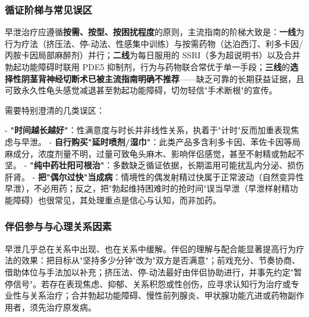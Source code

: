\subsubsection{循证阶梯与常见误区}

早泄治疗应遵循\textbf{按需、按型、按困扰程度}的原则，主流指南的阶梯大致是：\textbf{一线}为行为疗法（挤压法、停-动法、性感集中训练）与按需药物（达泊西汀、利多卡因/丙胺卡因局部麻醉剂）并行；\textbf{二线}为每日服用的 SSRI（多为超说明书）以及合并勃起功能障碍时联用 PDE5 抑制剂，行为与药物联合常优于单一手段；\textbf{三线}的\textbf{选择性阴茎背神经切断术已被主流指南明确不推荐}——缺乏可靠的长期获益证据，且可致永久性龟头感觉减退甚至勃起功能障碍，切勿轻信"手术断根"的宣传。

需要特别澄清的几类误区：

- \textbf{"时间越长越好"}：性满意度与时长并非线性关系，执着于"计时"反而加重表现焦虑与早泄。
- \textbf{自行购买"延时喷剂/湿巾"}：此类产品多含利多卡因、苯佐卡因等局麻成分，浓度剂量不明，过量可致龟头麻木、影响伴侣感觉，甚至不射精或勃起不坚。
- \textbf{"纯中药壮阳可根治"}：多数缺乏循证依据，长期滥用可能扰乱内分泌、损伤肝肾。
- \textbf{把"偶尔过快"当成病}：情境性的偶发射精过快属于正常波动（自然变异性早泄），不必用药；反之，把"勃起维持困难时的抢时间"误当早泄（早泄样射精功能障碍）也很常见，其处理重点是信心与认知，而非加药。

\subsubsection{伴侣参与与心理关系因素}

早泄几乎总在关系中出现、也在关系中缓解。伴侣的理解与配合能显著提高行为疗法的效果：把目标从"坚持多少分钟"改为"双方是否满意"；前戏充分、节奏协商、借助体位与手法加以补充；挤压法、停-动法最好由伴侣协助进行，并事先约定"暂停信号"。若存在表现焦虑、抑郁、关系积怨或性创伤，应寻求认知行为治疗或专业性与关系治疗；合并勃起功能障碍、慢性前列腺炎、甲状腺功能亢进或药物副作用者，须先治疗原发病。
